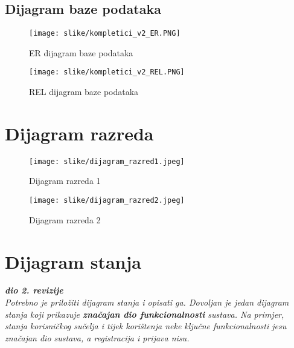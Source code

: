			\subsection{Dijagram baze podataka}
				
				\begin{figure}[H]
					\texttt{[image: slike/kompletici\_v2\_ER.PNG]} %
					\centering
					\caption{ER dijagram baze podataka}
					\label{fig:promjene}
				\end{figure}
				
					\begin{figure}[H]
					\texttt{[image: slike/kompletici\_v2\_REL.PNG]} %
					\centering
					\caption{REL dijagram baze podataka}
					\label{fig:promjene}
				\end{figure}
				
				
			
			\eject
			
			
		\section{Dijagram razreda}
		
			\begin{figure}[H]
				\texttt{[image: slike/dijagram\_razred1.jpeg]} %
				\centering
				\caption{Dijagram razreda 1}
				\label{fig:promjene}
			\end{figure}
			
			\begin{figure}[H]
				\texttt{[image: slike/dijagram\_razred2.jpeg]} %
				\centering
				\caption{Dijagram razreda 2}
				\label{fig:promjene}
			\end{figure}
			
			
			
			\eject
		
		\iffalse
		\section{Dijagram stanja}
			
			
			\textbf{\textit{dio 2. revizije}}\\
			
			\textit{Potrebno je priložiti dijagram stanja i opisati ga. Dovoljan je jedan dijagram stanja koji prikazuje \textbf{značajan dio funkcionalnosti} sustava. Na primjer, stanja korisničkog sučelja i tijek korištenja neke ključne funkcionalnosti jesu značajan dio sustava, a registracija i prijava nisu. }
			

